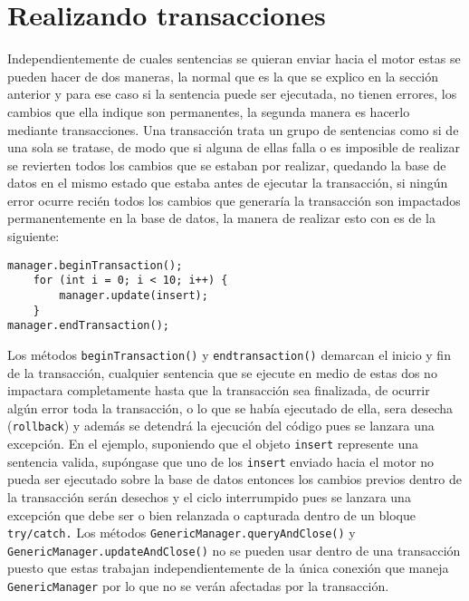 \section{Realizando transacciones}
Independientemente de cuales sentencias se quieran enviar hacia el motor estas se pueden hacer de dos maneras, la normal que es la que se explico en la sección anterior y para ese caso si la  sentencia puede ser ejecutada, no tienen errores, los cambios que ella indique son permanentes, la segunda manera es hacerlo mediante transacciones. Una transacción trata un grupo de sentencias como si de una sola se tratase, de modo que si alguna de ellas falla o es imposible de realizar se revierten todos los cambios que se estaban por realizar, quedando la base de datos en el mismo estado que estaba antes de ejecutar la transacción, si ningún error ocurre recién todos los cambios que generaría la transacción son impactados permanentemente en la base de datos, la manera de realizar esto con \jj es de la siguiente:
%
\begin{lstlisting}[title=Realizando una transacción]
manager.beginTransaction();
	for (int i = 0; i < 10; i++) {
		manager.update(insert);
	}
manager.endTransaction();
\end{lstlisting}
%
Los métodos \verb=beginTransaction()= y \verb=endtransaction()= demarcan el inicio y fin de la transacción, cualquier sentencia que se ejecute en medio de estas dos no impactara completamente hasta que la transacción sea finalizada, de ocurrir algún error toda la transacción, o lo que se había ejecutado de ella, sera desecha (\verb=rollback=) y además se detendrá la ejecución del código pues se lanzara una excepción. En el ejemplo, suponiendo que el objeto \verb=insert= represente una sentencia valida, supóngase que  uno de los \verb=insert= enviado hacia el motor no pueda ser ejecutado sobre la base de datos entonces los cambios previos dentro de la transacción serán desechos y el ciclo interrumpido pues se lanzara una excepción que debe ser o  bien relanzada o capturada dentro de un bloque \verb=try/catch.= Los métodos \verb=GenericManager.queryAndClose()= y \verb=GenericManager.updateAndClose()= no se pueden usar dentro de una transacción puesto que estas trabajan independientemente de la única conexión  que maneja \verb=GenericManager= por lo que no se verán afectadas por la transacción.
%

